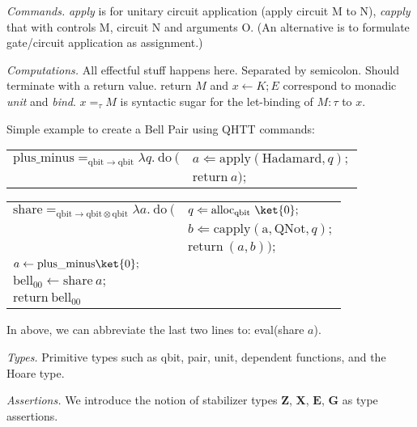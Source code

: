 \documentclass[acmsmall,nonacm,review,timestamp]{acmart}
\newcommand{\Z}{\ensuremath{\mathbf{Z}}\xspace}
\newcommand{\X}{\ensuremath{\mathbf{X}}\xspace}
\newcommand{\E}{\ensuremath{\mathbf{E}}\xspace}
\renewcommand{\G}{\ensuremath{\mathbf{G}}\xspace}
\begin{document}
\textit{Commands.} \textit{apply} is for unitary circuit application (apply circuit M to N), \textit{capply} that with controls M, circuit N and arguments O. (An alternative is to formulate gate/circuit application as assignment.)

\textit{Computations.} All effectful stuff happens here. Separated by semicolon. Should terminate with a return value. return $M$ and $x \gets K; E$ correspond to monadic \textit{unit} and \textit{bind}. $x =_\tau M$ is syntactic sugar for the let-binding of $M:\tau$ to $x$.

Simple example to create a Bell Pair using QHTT commands:

\begin{center}
\begingroup
\setlength{\tabcolsep}{0pt}
\begin{tabular}{ll}

	$\mathrm{plus\_minus} =_{\mathrm{qbit} \to \mathrm{qbit}} \lambda q.\ \mathrm{do}\ ($&$a \Leftarrow \mathrm{apply}(\mathrm{Hadamard}, q);$\\
																																	&$\mathrm{return}\ a);$\\
\end{tabular}

\begin{tabular}{ll}
	$\mathrm{share} =_{\mathrm{qbit} \to \mathrm{qbit} \otimes \mathrm{qbit}} \lambda a.\ \mathrm{do}\ ($&$q \Leftarrow \mathrm{alloc_{qbit}}\ \ket{0};$\\
		&$b \Leftarrow \mathrm{capply}(\mathrm{a, QNot}, q);$\\
		&$\mathrm{return}\ (a, b));$\\
	$a \gets \mathrm{plus\_minus} \ket{0};$ & \\
	$\mathrm{bell_{00}} \gets \mathrm{share}\ a;$ & \\
	$\mathrm{return}\ \mathrm{bell_{00}}$&
\end{tabular}
\endgroup
\end{center}

In above, we can abbreviate the last two lines to: eval(share $a$).

\textit{Types.} Primitive types such as qbit, pair, unit, dependent functions, and the Hoare type.

\textit{Assertions.} We introduce the notion of stabilizer types \Z, \X, \E, \G as type assertions. 
\end{document}

